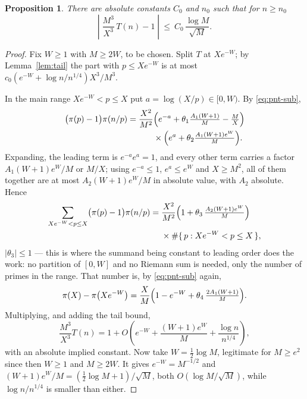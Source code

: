 \documentclass[a4paper,11pt,oneside,reqno]{amsart}
\theoremstyle{definition}
\theoremstyle{remark}
\theoremstyle{plain}
\newtheorem{proposition}[definition]{Proposition}
\begin{document}
\begin{proposition}\label{prop:T}
  There are absolute constants \(C_0\) and \(n_0\) such that for \(n \ge n_0\)
  \begin{equation}\label{eq:Tasymp}
    \left|\;\frac{M^{3}}{X^{3}}\,T(n)-1\;\right|
      \ \le \ C_0\,\frac{\log M}{\sqrt M} .
  \end{equation}
\end{proposition}

\begin{proof}
  Fix \(W \ge 1\) with \(M \ge 2W\), to be chosen. Split \(T\) at \(Xe^{-W}\); by
  Lemma~\ref{lem:tail} the part with \(p \le Xe^{-W}\) is at most
  \(c_0(e^{-W}+\log n/n^{1/4})X^{3}/M^{3}\).

  In the main range \(Xe^{-W} < p \le X\) put \(a = \log(X/p) \in [0,W)\). By
  \eqref{eq:pnt-sub},
  \begin{align*}
    \bigl(\pi(p)-1\bigr)\pi(n/p)
      =\frac{X^{2}}{M^{2}}
       &\Bigl(e^{-a}+\theta_1\tfrac{A_1(W+1)}{M}-\tfrac{M}{X}\Bigr)\\
       &\times
       \Bigl(e^{a}+\theta_2\tfrac{A_1(W+1)e^{W}}{M}\Bigr).
  \end{align*}
  Expanding, the leading term is \(e^{-a}e^{a} = 1\), and every other term
  carries a factor \(A_1(W+1)e^{W}/M\) or \(M/X\); using \(e^{-a} \le 1\),
  \(e^{a} \le e^{W}\) and \(X \ge M^{2}\), all of them together are at most
  \(A_2(W+1)e^{W}/M\) in absolute value, with \(A_2\) absolute. Hence
  \begin{align*}
    \sum_{Xe^{-W} < p \le X}\bigl(\pi(p)-1\bigr)\pi(n/p)
      ={}&\frac{X^{2}}{M^{2}}
          \Bigl(1+\theta_3\,\tfrac{A_2(W+1)e^{W}}{M}\Bigr)\\
        &\times \#\{\,p : Xe^{-W} < p \le X\,\},
  \end{align*}
  \(|\theta_3|\le 1\) --- this is where the summand being constant to leading
  order does the work: no partition of \([0,W]\) and no Riemann sum is needed,
  only the number of primes in the range. That number is, by
  \eqref{eq:pnt-sub} again,
  \[
    \pi(X)-\pi\bigl(Xe^{-W}\bigr)
      =\frac{X}{M}\Bigl(1-e^{-W}+\theta_4\,\tfrac{2A_1(W+1)}{M}\Bigr).
  \]
  Multiplying, and adding the tail bound,
  \[
    \frac{M^{3}}{X^{3}}T(n)
      =1+O\!\left(e^{-W}+\frac{(W+1)e^{W}}{M}+\frac{\log n}{n^{1/4}}\right),
  \]
  with an absolute implied constant. Now take \(W = \tfrac{1}{2}\log M\), legitimate
  for \(M \ge e^{2}\) since then \(W \ge 1\) and \(M \ge 2W\). It gives
  \(e^{-W} = M^{-1/2}\) and \((W+1)e^{W}/M = (\tfrac{1}{2}\log M+1)/\sqrt M\), both
  \(O(\log M/\sqrt M)\), while \(\log n/n^{1/4}\) is smaller than either.
\end{proof}
\end{document}
